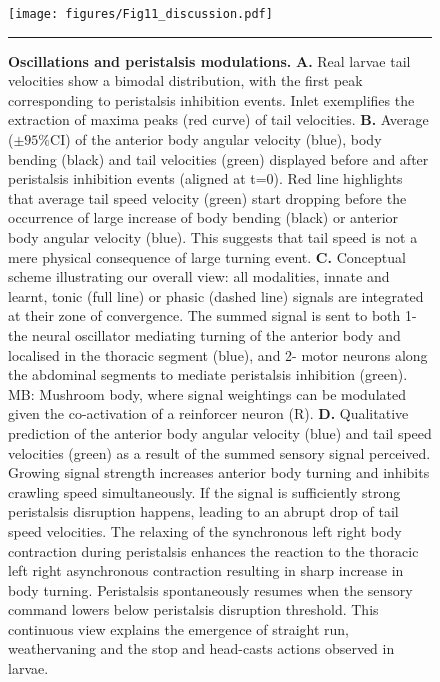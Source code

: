 \documentclass[10pt,a4paper]{article}
\begin{document}
\begin{figure}[!ht]
\begin{center}
\texttt{[image: figures/Fig11\_discussion.pdf]}
\caption{{\bf Oscillations and peristalsis modulations.} {\bf A.} Real larvae tail velocities show a bimodal distribution, with the first peak corresponding to peristalsis inhibition events. Inlet exemplifies the extraction of maxima peaks (red curve) of tail velocities.
{\bf  B.} Average ($\pm 95\%$CI) of the anterior body angular velocity (blue), body bending (black) and tail velocities (green) displayed before and after peristalsis inhibition events (aligned at t=0). Red line highlights that average tail speed velocity (green) start dropping before the occurrence of large increase of body bending (black) or anterior body angular velocity (blue). This suggests that tail speed is not a mere physical consequence of large turning event.
{\bf C.} Conceptual scheme illustrating our overall view: all modalities, innate and learnt, tonic (full line) or phasic (dashed line) signals are integrated at their zone of convergence. The summed signal is sent to both 1-the neural oscillator mediating turning of the anterior body and localised in the thoracic segment (blue), and 2- motor neurons along the abdominal segments to mediate peristalsis inhibition (green). MB: Mushroom body, where signal weightings can be modulated given the co-activation of a reinforcer neuron (R).
{\bf D.} Qualitative prediction of the anterior body angular velocity (blue) and tail speed velocities (green) as a result of the summed sensory signal perceived. Growing signal strength increases anterior body turning and inhibits crawling speed simultaneously. If the signal is sufficiently strong peristalsis disruption happens, leading to an abrupt drop of tail speed velocities. The relaxing of the synchronous left right body contraction during peristalsis enhances the reaction to the thoracic left right asynchronous contraction resulting in sharp increase in body turning. Peristalsis spontaneously resumes when the sensory command lowers below peristalsis disruption threshold. This continuous view explains the emergence of straight run, weathervaning and the stop and head-casts actions observed in larvae.
\label{fig:Fig11}}
\hrule
\end{center}
\end{figure}
\end{document}
